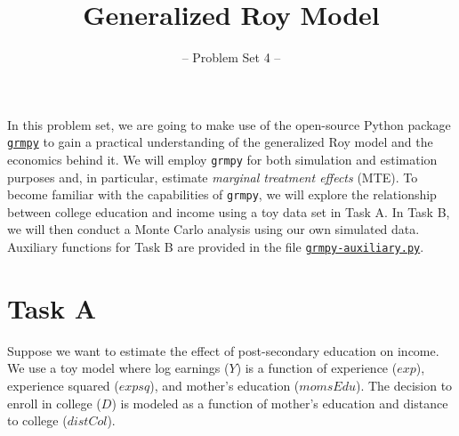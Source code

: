 

\title{Generalized Roy Model}
\subtitle{-- Problem Set 4 --}
\date{}

\maketitle\vspace{-2cm}

In this problem set, we are going to make use of the open-source Python package \href{https://grmpy.readthedocs.io/en/latest/}{\texttt{grmpy}} to gain a practical understanding of the generalized Roy model and the economics behind it. We will employ \texttt{grmpy} for both simulation and estimation purposes and, in particular, estimate \emph{marginal treatment effects} (MTE). To become familiar with the capabilities of {\texttt{grmpy}}, we will explore the relationship between college education and income using a toy data set in Task A. 
In Task B, we will then conduct a Monte Carlo analysis using our own simulated data. Auxiliary functions for Task B are provided in the file \href{https://github.com/HumanCapitalAnalysis/microeconometrics/tree/peisenha_integration_problem_set/problem-sets/01-potential-outcome-model/data}{\texttt{grmpy-auxiliary.py}}.

\section*{Task A} 

Suppose we want to estimate the effect of post-secondary education on income. We use a toy model where log earnings ($Y$) is a function of experience ($exp$), experience squared ($expsq$), and mother's education ($momsEdu$). The decision to enroll in college ($D$) is modeled as a function of mother's education and distance to college ($distCol$).


